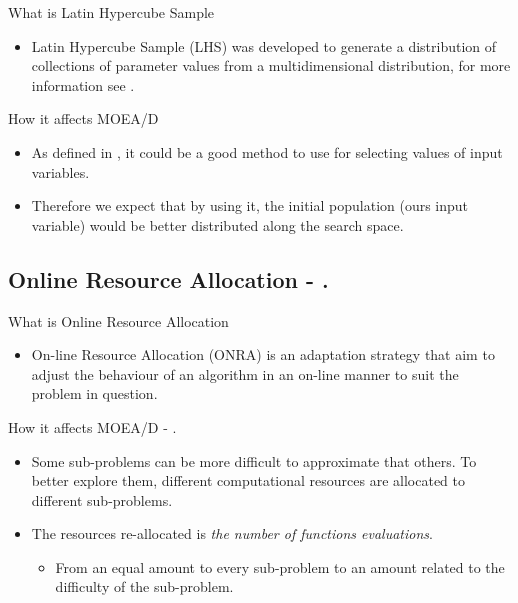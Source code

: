 \documentclass[ignorenonframetext,]{beamer}
\providecommand{\tightlist}{%
  \setlength{\itemsep}{0pt}\setlength{\parskip}{0pt}}
\begin{document}
\begin{frame}{What is Latin Hypercube Sample}

\begin{itemize}
\tightlist
\item
  Latin Hypercube Sample (LHS) was developed to generate a distribution
  of collections of parameter values from a multidimensional
  distribution, for more information see \citet{stein1987large}.
\end{itemize}

\end{frame}

\begin{frame}{How it affects MOEA/D}

\begin{itemize}
\item
  As defined in \citet{mckay1979comparison}, it could be a good method
  to use for selecting values of input variables.
\item
  Therefore we expect that by using it, the initial population (ours
  input variable) would be better distributed along the search space.
\end{itemize}

\end{frame}

\subsection{\texorpdfstring{Online Resource Allocation -
\citet{zhou2016all}.}{Online Resource Allocation - @zhou2016all.}}\label{online-resource-allocation---zhou2016all.}

\begin{frame}{What is Online Resource Allocation}

\begin{itemize}
\tightlist
\item
  On-line Resource Allocation (ONRA) is an adaptation strategy that aim
  to adjust the behaviour of an algorithm in an on-line manner to suit
  the problem in question.
\end{itemize}

\end{frame}

\begin{frame}{How it affects MOEA/D - \citet{zhou2016all}.}

\begin{itemize}
\item
  Some sub-problems can be more difficult to approximate that others. To
  better explore them, different computational resources are allocated
  to different sub-problems.
\item
  The resources re-allocated is \emph{the number of functions
  evaluations}.

  \begin{itemize}
  \tightlist
  \item
    From an equal amount to every sub-problem to an amount related to
    the difficulty of the sub-problem.
  \end{itemize}
\end{itemize}

\end{frame}
\end{document}
